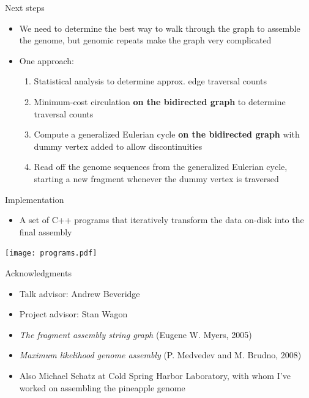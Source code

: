 \documentclass[xcolor=dvipsnames]{beamer}
\begin{document}
\begin{frame}{Next steps}
    \begin{itemize}
        \item We need to determine the best way to walk through the graph to
            assemble the genome, but genomic repeats make the graph very
            complicated
        \item One approach:
            \begin{enumerate}
                \item Statistical analysis to determine approx. edge traversal counts
                \item Minimum-cost circulation {\bf on the bidirected graph} to
                      determine traversal counts
                \item Compute a generalized Eulerian cycle {\bf on the bidirected graph}
                      with dummy vertex added to allow discontinuities
                \item Read off the genome sequences from the generalized Eulerian cycle,
                      starting a new fragment whenever the dummy vertex is traversed
            \end{enumerate}
    \end{itemize}
\end{frame}

\begin{frame}{Implementation}
	\begin{minipage}{0.3\textwidth}
		\begin{itemize}
			\item A set of C++ programs that iteratively transform
			the data on-disk into the final assembly
		\end{itemize}
	\end{minipage}
	\begin{minipage}{0.67\textwidth}
		\texttt{[image: programs.pdf]}
	\end{minipage}
\end{frame}

\begin{frame}{Acknowledgments}
    \begin{itemize}
        \item Talk advisor: Andrew Beveridge
        \item Project advisor: Stan Wagon
        \item {\em The fragment assembly string graph} (Eugene W. Myers, 2005)
        \item {\em Maximum likelihood genome assembly} (P. Medvedev  and M. Brudno, 2008)
        \item Also Michael Schatz at Cold Spring Harbor Laboratory, with whom
              I've worked on assembling the pineapple genome
    \end{itemize}
\end{frame}
\end{document}
